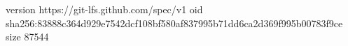 version https://git-lfs.github.com/spec/v1
oid sha256:83888c364d929e7542dcf108bf580af837995b71dd6ca2d369f995b00783f9ce
size 87544
